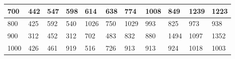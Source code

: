\documentclass[10pt,letterpaper]{article}
\begin{document}
\begin{center}
\begin{table}
\begin{tabular} { |m{0.5cm}|m{1.3cm}|m{1.3cm}|m{1.3cm}|m{1.3cm}|m{1.3cm}|m{1.3cm}|m{1.3cm}|m{1.3cm}|m{1.3cm}|m{1.3cm}|}
\hline
\cellcolor{Gray}700 & \Large 442 & \Large 547 & \Large 598 & \Large 614 & \Large 638 & \Large 774 & \Large 1008 & \Large 849 & \Large 1239 & \Large 1223 \\
\hline
\cellcolor{Gray}800 & \Large 425 & \Large 592 & \Large 540 & \Large 1026 & \Large 750 & \Large 1029 & \Large 993 & \Large 825 & \Large 973 & \Large 938 \\
\hline
\cellcolor{Gray}900 & \Large 312 & \Large 452 & \Large 312 & \Large 702 & \Large 483 & \Large 832 & \Large 880 & \Large 1494 & \Large 1097 & \Large 1352 \\
\hline
\cellcolor{Gray}1000 & \Large 426 & \Large 461 & \Large 919 & \Large 516 & \Large 726 & \Large 913 & \Large 913 & \Large 924 & \Large 1018 & \Large 1003 \\
\hline
\end{tabular} \\
\end{table}
\end{center}
\newpage 
{}
\end{document}
